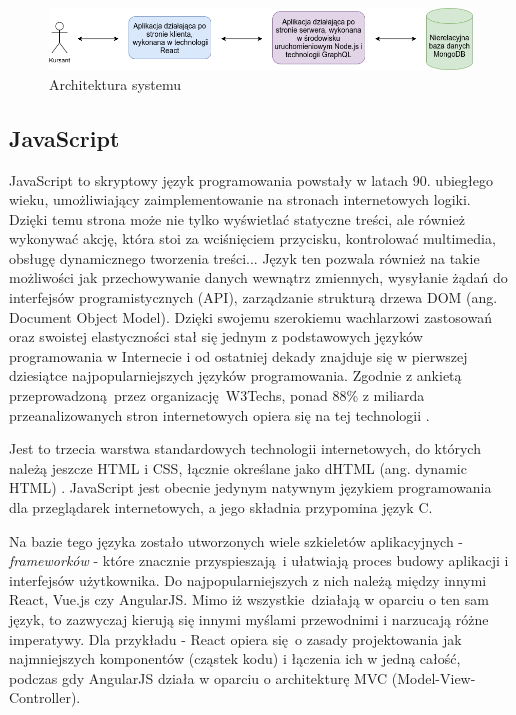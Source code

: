 \documentclass[12pt,twoside]{article}
\begin{document}
\begin{figure}[H]
	\centering
	\includegraphics[width=1\linewidth]{figures/app-architecture}
	\caption{Architektura systemu}
	\label{fig:system-architecture}
\end{figure}

\subsection{JavaScript}

JavaScript to skryptowy język programowania powstały w latach 90. ubiegłego wieku, umożliwiający zaimplementowanie na stronach internetowych logiki. Dzięki temu strona może nie tylko wyświetlać statyczne treści, ale również wykonywać akcję, która stoi za wciśnięciem przycisku, kontrolować multimedia, obsługę dynamicznego tworzenia treści... Język ten pozwala również na takie możliwości jak przechowywanie danych wewnątrz zmiennych, wysyłanie żądań do interfejsów programistycznych (API), zarządzanie strukturą drzewa DOM (ang. Document Object Model). Dzięki swojemu szerokiemu wachlarzowi zastosowań oraz swoistej elastyczności stał się jednym z podstawowych języków programowania w Internecie i od ostatniej dekady znajduje się w pierwszej dziesiątce najpopularniejszych języków programowania. Zgodnie z ankietą przeprowadzoną przez organizację W3Techs, ponad 88\% z miliarda przeanalizowanych stron internetowych opiera się na tej technologii \cite{JavascriptPopularity}. 

Jest to trzecia warstwa standardowych technologii internetowych, do których należą jeszcze HTML i CSS, łącznie określane jako dHTML (ang. dynamic HTML) \cite{JS}. JavaScript jest obecnie jedynym natywnym językiem programowania dla przeglądarek internetowych, a jego składnia przypomina język C. 

Na bazie tego języka zostało utworzonych wiele szkieletów aplikacyjnych - \emph{frameworków} -  które znacznie przyspieszają i ułatwiają proces budowy aplikacji i interfejsów użytkownika. Do najpopularniejszych z nich należą między innymi React, Vue.js czy AngularJS. Mimo iż wszystkie działają w oparciu o ten sam język, to zazwyczaj kierują się innymi myślami przewodnimi i narzucają różne imperatywy. Dla przykładu - React opiera się o zasady projektowania jak najmniejszych komponentów (cząstek kodu) i łączenia ich w jedną całość, podczas gdy AngularJS działa w oparciu o architekturę MVC (Model-View-Controller).
\end{document}
